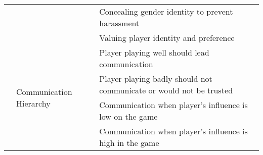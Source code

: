 \begin{table}[!htbp]
{\begin{tabular}{ll|l}
\multicolumn{1}{l|}{}                                                                                                                                                                                    &                                                                                                             & Concealing gender identity to prevent harassment                    \\ \cline{3-3} 
\multicolumn{1}{l|}{}                                                                                                                                                                                    &                                                                                                             & Valuing player identity and preference                              \\ \cline{2-3} 
\multicolumn{1}{l|}{}                                                                                                                                                                                    & \multirow{4}{*}{Communication Hierarchy}                                                                    & Player playing well should lead communication                       \\ \cline{3-3} 
\multicolumn{1}{l|}{}                                                                                                                                                                                    &                                                                                                             & Player playing badly should not communicate or would not be trusted \\ \cline{3-3} 
\multicolumn{1}{l|}{}                                                                                                                                                                                    &                                                                                                             & Communication when player's influence is low on the game            \\ \cline{3-3} 
\multicolumn{1}{l|}{}                                                                                                                                                                                    &                                                                                                             & Communication when player's influence is high in the game           \\ \cline{2-3} 

\end{tabular}}
\end{table}
